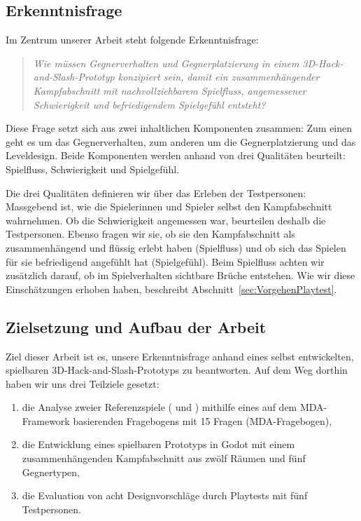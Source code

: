 \documentclass[../Main.tex]{subfiles}
\begin{document}
\subsection{Erkenntnisfrage} \label{sec:Erkenntnisfrage}

Im Zentrum unserer Arbeit steht folgende Erkenntnisfrage:

\vspace{\baselineskip}

\begin{quote}
    \textit{Wie müssen Gegnerverhalten und Gegnerplatzierung in einem 3D-Hack-and-Slash-Prototyp konzipiert sein, damit ein zusammenhängender Kampfabschnitt mit nachvollziehbarem Spielfluss, angemessener Schwierigkeit und befriedigendem Spielgefühl entsteht?}
\end{quote}

\vspace{\baselineskip}

Diese Frage setzt sich aus zwei inhaltlichen Komponenten zusammen: Zum einen geht es um das Gegnerverhalten, zum anderen um die Gegnerplatzierung und das Leveldesign. Beide Komponenten werden anhand von drei Qualitäten beurteilt: Spielfluss, Schwierigkeit und Spielgefühl.

Die drei Qualitäten definieren wir über das Erleben der Testpersonen: Massgebend ist, wie die Spielerinnen und Spieler selbst den Kampfabschnitt wahrnehmen. Ob die Schwierigkeit angemessen war, beurteilen deshalb die Testpersonen. Ebenso fragen wir sie, ob sie den Kampfabschnitt als zusammenhängend und flüssig erlebt haben (Spielfluss) und ob sich das Spielen für sie befriedigend angefühlt hat (Spielgefühl). Beim Spielfluss achten wir zusätzlich darauf, ob im Spielverhalten sichtbare Brüche entstehen. Wie wir diese Einschätzungen erhoben haben, beschreibt Abschnitt~\ref{sec:VorgehenPlaytest}.

\subsection{Zielsetzung und Aufbau der Arbeit} \label{sec:Aufbau}

Ziel dieser Arbeit ist es, unsere Erkenntnisfrage anhand eines selbst entwickelten, spielbaren 3D-Hack-and-Slash-Prototyps zu beantworten. Auf dem Weg dorthin haben wir uns drei Teilziele gesetzt:

\begin{enumerate}
    \item die Analyse zweier Referenzspiele ( und ) mithilfe eines auf dem MDA-Framework basierenden Fragebogens mit 15 Fragen (MDA-Fragebogen),
    \item die Entwicklung eines spielbaren Prototyps in Godot mit einem zusammenhängenden Kampfabschnitt aus zwölf Räumen und fünf Gegnertypen,
    \item die Evaluation von acht Designvorschläge durch Playtests mit fünf Testpersonen.
\end{enumerate}
\end{document}
